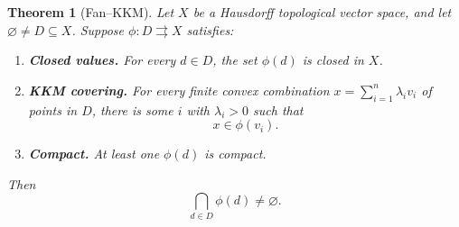 \documentclass[11pt]{article}
\newtheorem{theorem}{Theorem}[section]
\theoremstyle{definition}
\theoremstyle{remark}
\begin{document}
\begin{theorem}[Fan--KKM]
	Let $X$ be a Hausdorff
	topological vector space, and let
	$\varnothing\neq D\subseteq X$.
	Suppose $\phi\colon D\rightrightarrows X$ satisfies:
	\begin{enumerate}
		\item \textbf{Closed values.}
		For every $d\in D$, the set $\phi(d)$ is
		closed in $X$.
		
		\item \textbf{KKM covering.}
		For every finite convex combination
		$x=\sum_{i=1}^n\lambda_i v_i$ of points in $D$,
		there is some $i$ with $\lambda_i>0$ such that
		\[
		x\in\phi(v_i).
		\]
		
		\item \textbf{Compact.} At least one $\phi(d)$ is compact. 
	\end{enumerate}
	Then
	\[
	\bigcap_{d\in D}\phi(d)\neq\varnothing.
	\]
\end{theorem}
\end{document}
